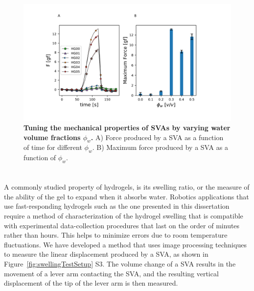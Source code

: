 \begin{figure}[!htb]
\centering
\includegraphics[width=.8\textwidth]{svaForce.pdf}
    \caption[]{\textbf{Tuning the mechanical properties of SVAs by varying water volume fractions $\phi_{w}$.} A) Force produced by a SVA as a function of time for different $\phi_{w}$. B) Maximum force produced by a SVA as a function of $\phi_{w}$. }
    \label{fig:svaForce}
\end{figure}

\section{}
A commonly studied property of hydrogels, is its swelling ratio, or the measure of the ability of the gel to expand when it absorbs water. Robotics applications that use fast-responding hydrogels such as the one presented in this dissertation require a method of characterization of the hydrogel swelling that is compatible with experimental data-collection procedures that last on the order of minutes rather than hours.  This helps to minimize errors due to room temperature fluctuations. We have developed a method that uses image processing techniques to measure the linear displacement produced by a SVA, as shown in Figure~\ref{fig:swellingTestSetup} S3. The volume change of a SVA results in the movement of a lever arm contacting the SVA, and the resulting vertical displacement of the tip of the lever arm is then measured. 

